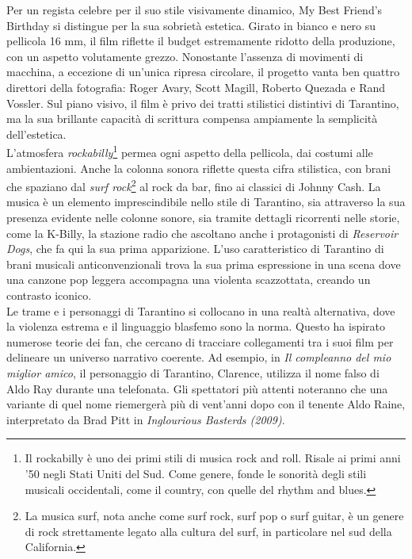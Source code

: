 \documentclass[12pt]{article} %
\begin{document}
\begin{flushleft}
Per un regista celebre per il suo stile visivamente dinamico, My Best Friend's Birthday si distingue per la sua sobrietà estetica. Girato in bianco e nero su pellicola 16 mm, il film riflette il budget estremamente ridotto della produzione, con un aspetto volutamente grezzo. Nonostante l’assenza di movimenti di macchina, a eccezione di un’unica ripresa circolare, il progetto vanta ben quattro direttori della fotografia: Roger Avary, Scott Magill, Roberto Quezada e Rand Vossler.
Sul piano visivo, il film è privo dei tratti stilistici distintivi di Tarantino, ma la sua brillante capacità di scrittura compensa ampiamente la semplicità dell’estetica. \\\vspace{1cm} L’atmosfera \textit{rockabilly}\footnote{Il rockabilly è uno dei primi stili di musica rock and roll. Risale ai primi anni '50 negli Stati Uniti del Sud. Come genere, fonde le sonorità degli stili musicali occidentali, come il country, con quelle del rhythm and blues.} permea ogni aspetto della pellicola, dai costumi alle ambientazioni. Anche la colonna sonora riflette questa cifra stilistica, con brani che spaziano dal \textit{surf rock}\footnote{La musica surf, nota anche come surf rock, surf pop o surf guitar, è un genere di rock strettamente legato alla cultura del surf, in particolare nel sud della California.} al rock da bar, fino ai classici di Johnny Cash. La musica è un elemento imprescindibile nello stile di Tarantino, sia attraverso la sua presenza evidente nelle colonne sonore, sia tramite dettagli ricorrenti nelle storie, come la K-Billy, la stazione radio che ascoltano anche i protagonisti di \textit{Reservoir Dogs}, che fa qui la sua prima apparizione. L’uso caratteristico di Tarantino di brani musicali anticonvenzionali trova la sua prima espressione in una scena dove una canzone pop leggera accompagna una violenta scazzottata, creando un contrasto iconico.\\\vspace{1cm}
Le trame e i personaggi di Tarantino si collocano in una realtà alternativa, dove la violenza estrema e il linguaggio blasfemo sono la norma. Questo ha ispirato numerose teorie dei fan, che cercano di tracciare collegamenti tra i suoi film per delineare un universo narrativo coerente. 
Ad esempio, in \textit{Il compleanno del mio miglior amico}, il personaggio di Tarantino, Clarence, utilizza il nome falso di Aldo Ray durante una telefonata. Gli spettatori più attenti noteranno che una variante di quel nome riemergerà più di vent'anni dopo con il tenente Aldo Raine, interpretato da Brad Pitt in \textit{Inglourious Basterds (2009)}. 

\end{flushleft}
\end{document}

